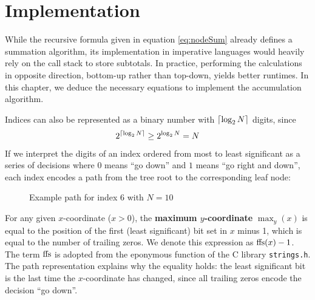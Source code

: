 \chapter{Implementation}
\label{ch:Implementation}

While the recursive formula given in equation \eqref{eq:nodeSum} already defines a summation algorithm, its implementation in imperative languages would
heavily rely on the call stack to store subtotals. In practice, performing the calculations in opposite direction, bottom-up rather than top-down, yields
better runtimes. In this chapter, we deduce the necessary equations to implement the accumulation algorithm.

Indices can also be represented as a binary number with $\lceil \log_2 N \rceil$ digits, since
\begin{equation}
2^{\lceil \log_2 N \rceil} \geq 2^{\log_2 N} = N
\end{equation}
If we interpret the digits of an index ordered from most to least significant as a series of decisions where $0$ means \enquote{go down}
and $1$ means \enquote{go right and down}, each index encodes a path from the tree root to the corresponding leaf node:

\begin{figure}[H]
\centering
{}
\caption{Example path for index $6$ with $N = 10$}
\label{fig:indexTreePath}
\end{figure}

For any given $x$-coordinate ($x > 0$), the \textbf{maximum $y$-coordinate} $\max_y(x)$ is equal to the position of the first (least significant) bit set in $x$ minus 1,
which is equal to the number of trailing zeros. We denote this expression as $\textrm{ffs} (x) - 1$. The term $\textrm{ffs}$ is adopted from the eponymous function
of the C library \texttt{strings.h}.
The path representation explains why the equality holds: the least significant bit is the last time the $x$-coordinate has changed, since all
trailing zeros encode the decision \enquote{go down}.

